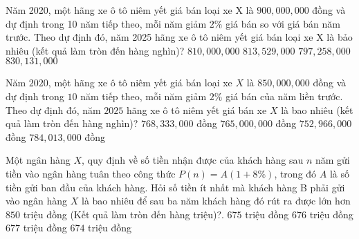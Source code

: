 \begin{ex}%
    Năm 2020, một hãng xe ô tô niêm yết giá bán loại xe X là $900{,}000{,}000$ đồng và dự định trong 10 năm tiếp theo, mỗi năm giảm $2\%$ giá bán so với giá bán năm trước. Theo dự định đó, năm 2025 hãng xe ô tô niêm yết giá bán loại xe X là bảo nhiêu (kết quả làm tròn đến hàng nghìn)?
    \choice
    {$810{,}000{,}000$}
    {\True $813{,}529{,}000$}
    {$797{,}258{,}000$}
    {$830{,}131{,}000$}
\end{ex}
\begin{ex}%
    [Mã 104 - 2020 Lần 2]%
    Năm $ 2020$, một hãng xe ô tô niêm yết giá bán loại xe $ X$ là $ 850{,}000{,}000$ đồng và dự định trong $ 10$ năm tiếp theo, mỗi năm giảm $ 2\%$ giá bán của năm liền trước. Theo dự định đó, năm $ 2025$ hãng xe ô tô niêm yết giá bán xe $ X$ là bao nhiêu (kết quả làm tròn đến hàng nghìn)?
    \choice
    {\True $ 768{,}333{,}000$ đồng}
    {$ 765{,}000{,}000$ đồng}
    {$ 752{,}966{,}000$ đồng}
    {$ 784{,}013{,}000$ đồng}
\end{ex}
\begin{ex}%
    [Chuyên Lương Văn Chánh - Phú Yên - 2020]%
    Một ngân hàng $ X$, quy định về số tiền nhận được của khách hàng sau $ n$ năm gửi tiền vào ngân hàng tuân theo công thức $ P(n)=A(1+8\%)$, trong đó $ A$ là số tiền gửi ban đầu của khách hàng. Hỏi số tiền ít nhất mà khách hàng B phải gửi vào ngân hàng $ X$ là bao nhiêu để sau ba năm khách hàng đó rút ra được lớn hơn $ 850$ triệu đồng (Kết quả làm tròn đến hàng triệu)?.
    \choice
    {\True $ 675$ triệu đồng}
    {$ 676$ triệu đồng}
    {$ 677$ triệu đồng}
    {$ 674$ triệu đồng}
\end{ex}
